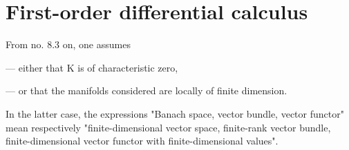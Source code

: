 \section{First-order differential calculus}

From no. 8.3 on, one assumes

--- either that K is of characteristic zero,

--- or that the manifolds considered are locally of finite dimension.

In the latter case, the expressions "Banach space, vector bundle, vector functor" mean respectively "finite-dimensional vector space, finite-rank vector bundle, finite-dimensional vector functor with finite-dimensional values".

